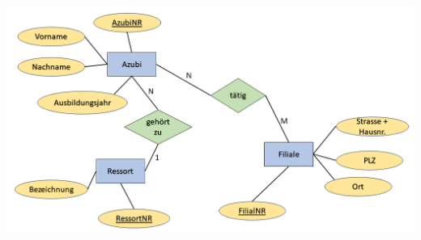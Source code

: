 \documentclass[a4paper,12pt, headsepline, ngerman]{scrartcl}
\begin{document}
	\begin{Answer}[ref=KAERMAufstellen]
		\begin{minipage}{\textwidth}\centering
			\includegraphics[width=\linewidth]{./pics/KlausurNR4.png}
		\end{minipage}%
	\end{Answer}%



\newpage
{}
\shipoutAnswer
\end{document}
